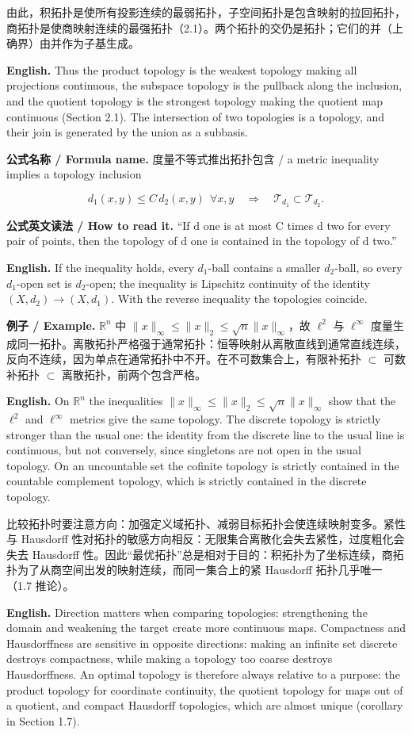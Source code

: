 \documentclass[UTF8,11pt,a4paper]{ctexart}
\newcommand{\EN}[1]{\par\noindent\textbf{English.} #1\par}
\newcommand{\READ}[1]{\par\noindent\textbf{公式英文读法 / How to read it.} #1\par}
\newcommand{\FORMULA}[2]{\par\noindent\textbf{公式名称 / Formula name.} #1 / #2\par}
\newcommand{\EX}[2]{\par\noindent\textbf{例子 / Example.} #1\par\EN{#2}}
\begin{document}
\noindent 由此，积拓扑是使所有投影连续的最弱拓扑，子空间拓扑是包含映射的拉回拓扑，商拓扑是使商映射连续的最强拓扑（2.1）。两个拓扑的交仍是拓扑；它们的并（上确界）由并作为子基生成。
\EN{Thus the product topology is the weakest topology making all projections continuous, the subspace topology is the pullback along the inclusion, and the quotient topology is the strongest topology making the quotient map continuous (Section 2.1). The intersection of two topologies is a topology, and their join is generated by the union as a subbasis.}

\FORMULA{度量不等式推出拓扑包含}{a metric inequality implies a topology inclusion}
\[
d_1(x,y)\le C\,d_2(x,y)\ \ \forall x,y
\quad\Longrightarrow\quad
\mathcal T_{d_1}\subset\mathcal T_{d_2}.
\]
\READ{``If d one is at most C times d two for every pair of points, then the topology of d one is contained in the topology of d two.''}
\EN{If the inequality holds, every $d_1$-ball contains a smaller $d_2$-ball, so every $d_1$-open set is $d_2$-open; the inequality is Lipschitz continuity of the identity $(X,d_2)\to(X,d_1)$. With the reverse inequality the topologies coincide.}

\EX{$\mathbb R^n$ 中 $\|x\|_\infty\le\|x\|_2\le\sqrt n\|x\|_\infty$，故 $\ell^2$ 与 $\ell^\infty$ 度量生成同一拓扑。离散拓扑严格强于通常拓扑：恒等映射从离散直线到通常直线连续，反向不连续，因为单点在通常拓扑中不开。在不可数集合上，有限补拓扑 $\subset$ 可数补拓扑 $\subset$ 离散拓扑，前两个包含严格。}{On $\mathbb R^n$ the inequalities $\|x\|_\infty\le\|x\|_2\le\sqrt n\|x\|_\infty$ show that the $\ell^2$ and $\ell^\infty$ metrics give the same topology. The discrete topology is strictly stronger than the usual one: the identity from the discrete line to the usual line is continuous, but not conversely, since singletons are not open in the usual topology. On an uncountable set the cofinite topology is strictly contained in the countable complement topology, which is strictly contained in the discrete topology.}

\noindent 比较拓扑时要注意方向：加强定义域拓扑、减弱目标拓扑会使连续映射变多。紧性与 Hausdorff 性对拓扑的敏感方向相反：无限集合离散化会失去紧性，过度粗化会失去 Hausdorff 性。因此“最优拓扑”总是相对于目的：积拓扑为了坐标连续，商拓扑为了从商空间出发的映射连续，而同一集合上的紧 Hausdorff 拓扑几乎唯一（1.7 推论）。
\EN{Direction matters when comparing topologies: strengthening the domain and weakening the target create more continuous maps. Compactness and Hausdorffness are sensitive in opposite directions: making an infinite set discrete destroys compactness, while making a topology too coarse destroys Hausdorffness. An optimal topology is therefore always relative to a purpose: the product topology for coordinate continuity, the quotient topology for maps out of a quotient, and compact Hausdorff topologies, which are almost unique (corollary in Section 1.7).}
\end{document}
